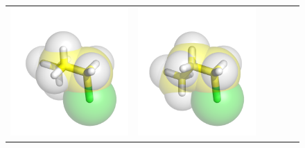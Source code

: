\documentclass{svmult}
\begin{document}
\begin{figure}
\begin{tabular}{cccccc}
\includegraphics[width=\tmpa]{fig/m003-009} & 
\includegraphics[width=\tmpa]{fig/m003-010} & 

\end{tabular}
\end{figure}
\end{document}
